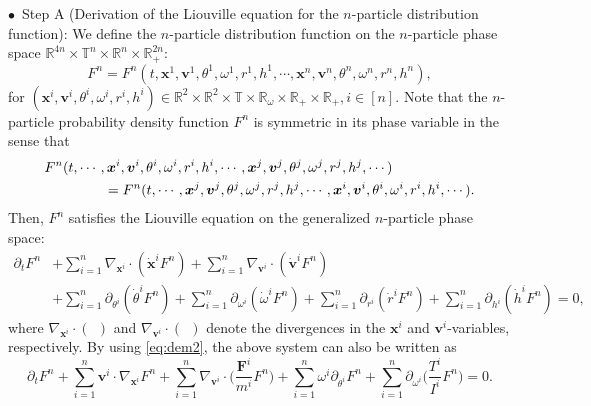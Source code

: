 \documentclass[a4paper,11pt]{article}
\numberwithin{equation}{section}
\theoremstyle{definition}
\newcommand{\bfx}{\boldsymbol{x}}
\newcommand{\bfv}{\boldsymbol{v}}
\newcommand{\bfF}{\boldsymbol{F}}
\newcommand{\bbr}{\mathbb R}
\begin{document}
\noindent $\bullet$~Step A (Derivation of the Liouville equation for the $n$-particle distribution function):  We define the $n$-particle distribution function on the $n$-particle phase space $\bbr^{4n}\times \mathbb{T}^{n}\times \bbr^{n} \times \bbr_+^{2n}$:
\begin{equation} \label{eq:pdfn}
 F^n = F^n(t,\bfx^1, \bfv^1, \theta^1, \omega^1, r^1, h^1, \cdots, \bfx^n, \bfv^n, \theta^n, \omega^n, r^n, h^n), 
\end{equation}
for $(\bfx^i, \bfv^i, \theta^i, \omega^i, r^i, h^i) \in \mathbb{R}^2\times \mathbb{R}^2 \times \mathbb{T} \times \bbr_{\omega} \times \mathbb{R}_+ \times \mathbb{R}_+, i \in [n]$. 
%
Note that the $n$-particle probability density function $F^n$ is symmetric in its phase variable in the sense that 
\begin{align}
\begin{aligned} \label{eq:pdfsym}
&  F^n(t,\cdots, \bfx^i, \bfv^i, \theta^i, \omega^i, r^i, h^i, \cdots, \bfx^j, \bfv^j, \theta^j, \omega^j, r^j, h^j, \cdots) \\
 & \hspace{1.5cm}   = F^n(t, \cdots, \bfx^j, \bfv^j, \theta^j, \omega^j, r^j, h^j, \cdots, \bfx^i, \bfv^i, \theta^i, \omega^i, r^i, h^i, \cdots).
\end{aligned}
\end{align}
Then, $F^n$ satisfies the Liouville equation on the generalized $n$-particle phase space:
\begin{equation} \label{eq:le}
\begin{aligned}
\partial_t F^n & + \sum_{i=1}^{n} \nabla_{\bfx^i} \cdot ( \dot{\bfx}^i F^n) + \sum_{i=1}^{n} \nabla_{\bfv^i} \cdot ( \dot{\bfv}^i F^n)  \\
& + \sum_{i=1}^{n} \partial_{\theta^i} ( \dot{\theta}^i F^n)  + \sum_{i=1}^{n} \partial_{\omega^i} ( \dot{\omega}^i F^n)  + \sum_{i=1}^{n} \partial_{r^i} ( \dot{r}^i F^n)  + \sum_{i=1}^{n} \partial_{h^i} ( \dot{h}^i F^n)  = 0,
\end{aligned}
\end{equation}
where $ \nabla_{\bfx^i}  \cdot (~  ~)$ and $ \nabla_{\bfv^i}  \cdot (~  ~)$ denote the divergences in the $\bfx^i$ and $\bfv^i$-variables, respectively. 
%
By using \eqref{eq:dem2}, the above system can also be written as 
\begin{equation} \label{eq:les}
\partial_t F^n +  \sum_{i=1}^{n} \bfv^i \cdot \nabla_{\bfx^i} F^n + \sum_{i=1}^{n} \nabla_{\bfv^i} \cdot \Big ( \frac{\bfF^i}{m^i} F^n \Big ) + \sum_{i=1}^{n} \omega^i \partial_{\theta^i} F^n + \sum_{i=1}^{n} \partial_{\omega^i} \Big( \frac{T^i}{I^i} F^n \Big)  = 0.
\end{equation}
\end{document}
